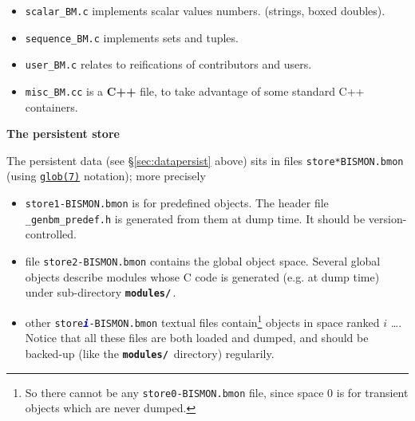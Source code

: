 \begin{appendices}
\begin{itemize}
  \item \texttt{scalar\_BM.c} implements scalar values
      
    numbers.  (strings,
    boxed doubles).

  \item \texttt{sequence\_BM.c} implements sets and
    tuples.

  \item \texttt{user\_BM.c} relates
     to reifications of
    contributors and  users.

  \item \texttt{misc\_BM.cc} is a \textbf{C++} file,
     to take advantage of
    some standard C++   containers.
\end{itemize}

{\large \textbf{The persistent store}}

The persistent data (see \S \ref{sec:datapersist} above) sits in files
 
 \texttt{store*BISMON.bmon}
(using
\href{https://man7.org/linux/man-pages/man7/glob.7.html}{\texttt{glob(7)}}
notation); more precisely

\begin{itemize}

\item \texttt{store{1}-BISMON.bmon} is for predefined objects. The header file
  \texttt{\_genbm\_predef.h} is generated from them at dump time. It should be version-controlled.

\item file \texttt{store{2}-BISMON.bmon} contains the global object space. Several
  global objects describe modules whose C code is generated (e.g. at
  dump time)   under sub-directory
  \textbf{\texttt{modules/}}\,.

\item other \texttt{store\textcolor{blue}{\textbf{\textit{i}}}-BISMON.bmon}
  textual files contain\footnote{So there cannot be any
    \texttt{store{0}-BISMON.bmon} file, since space 0 is for transient objects
    which are never dumped.}  objects in space ranked $i$ \ldots. Notice
  that all these files are both loaded and dumped, and should be
  backed-up (like the \textbf{\texttt{modules/}}\, directory)
  regularily.


\end{itemize}
\end{appendices}

